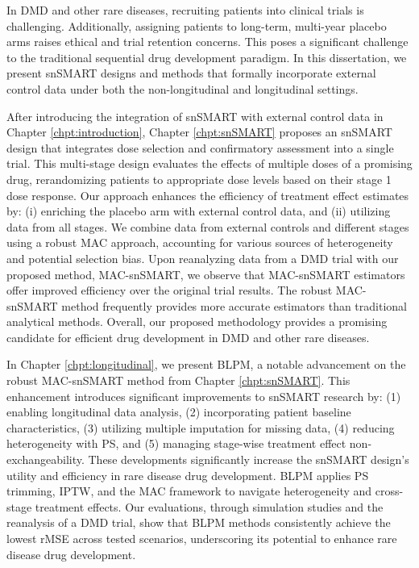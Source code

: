 In \ac{DMD} and other rare diseases, recruiting patients into clinical trials is challenging. Additionally, assigning patients to long-term, multi-year placebo arms raises ethical and trial retention concerns. This poses a significant challenge to the traditional sequential drug development paradigm. In this dissertation, we present \ac{snSMART} designs and methods that formally incorporate external control data under both the non-longitudinal and longitudinal settings.

After introducing the integration of \ac{snSMART} with external control data in Chapter \ref{chpt:introduction}, Chapter \ref{chpt:snSMART} proposes an \ac{snSMART} design that integrates dose selection and confirmatory assessment into a single trial. This multi-stage design evaluates the effects of multiple doses of a promising drug, rerandomizing patients to appropriate dose levels based on their stage 1 dose response. Our approach enhances the efficiency of treatment effect estimates by: (i) enriching the placebo arm with external control data, and (ii) utilizing data from all stages. We combine data from external controls and different stages using a robust \ac{MAC} approach, accounting for various sources of heterogeneity and potential selection bias. Upon reanalyzing data from a \ac{DMD} trial with our proposed method, MAC-snSMART, we observe that MAC-snSMART estimators offer improved efficiency over the original trial results. The robust MAC-snSMART method frequently provides more accurate estimators than traditional analytical methods. Overall, our proposed methodology provides a promising candidate for efficient drug development in \ac{DMD} and other rare diseases.

In Chapter \ref{chpt:longitudinal}, we present \ac{BLPM}, a notable advancement on the robust MAC-snSMART method from Chapter \ref{chpt:snSMART}. This enhancement introduces significant improvements to \ac{snSMART} research by: (1) enabling longitudinal data analysis, (2) incorporating patient baseline characteristics, (3) utilizing multiple imputation for missing data, (4) reducing heterogeneity with \ac{PS}, and (5) managing stage-wise treatment effect non-exchangeability. These developments significantly increase the snSMART design's utility and efficiency in rare disease drug development. \ac{BLPM} applies \ac{PS} trimming, \ac{IPTW}, and the \ac{MAC} framework to navigate heterogeneity and cross-stage treatment effects. Our evaluations, through simulation studies and the reanalysis of a \ac{DMD} trial, show that \ac{BLPM} methods consistently achieve the lowest \ac{rMSE} across tested scenarios, underscoring its potential to enhance rare disease drug development.


